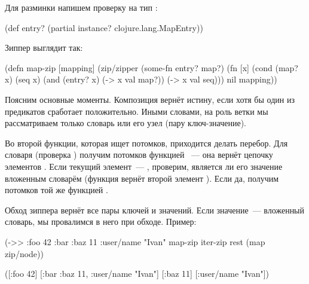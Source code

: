 Для разминки напишем проверку на тип :

\begin{english}
  \begin{clojure}
(def entry?
  (partial instance? clojure.lang.MapEntry))
  \end{clojure}
\end{english}

Зиппер  выглядит так:

\begin{english}
  \begin{clojure/lines}
(defn map-zip [mapping]
  (zip/zipper
   (some-fn entry? map?)
   (fn [x]
     (cond
       (map? x)
       (seq x)
       (and (entry? x) (-> x val map?))
       (-> x val seq)))
   nil
   mapping))
  \end{clojure/lines}
\end{english}

Поясним основные моменты. Композиция   вернёт истину,
если хотя бы один из предикатов сработает положительно. Иными словами, на роль
ветки мы рассматриваем только словарь или его узел (пару ключ-значение).

Во второй функции, которая ищет потомков, приходится делать перебор. Для словаря
(проверка ) получим потомков функцией ~--- она вернёт цепочку
элементов . Если текущий элемент~--- , проверим, является ли
его значение вложенным словарём (функция  вернёт второй элемент
). Если да, получим потомков той же функцией .

Обход зиппера вернёт все пары ключей и значений. Если значение~--- вложенный
словарь, мы провалимся в него при обходе. Пример:

\iflarge

\begin{english}
  \begin{clojure}
(->> {:foo 42
      :bar {:baz 11
            :user/name "Ivan"}}
     map-zip
     iter-zip
     rest
     (map zip/node))
  \end{clojure}
\end{english}

\begin{english}
  \begin{clojure}
([:foo 42]
 [:bar {:baz 11, :user/name "Ivan"}]
 [:baz 11]
 [:user/name "Ivan"])
  \end{clojure}
\end{english}

